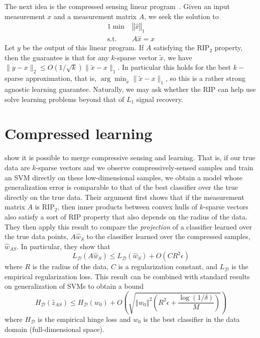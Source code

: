 \documentclass[english]{article}
\begin{document}
The next idea is the compressed sensing linear program~\citep{Candes06}.
Given an input measurement $x$ and a measurement matrix $A$, we seek the solution to
\begin{alignat*}{1}
\min & \left\Vert \widehat{x}\right\Vert _{1}\\
\text{s.t.} & A\widehat{x}=x
\end{alignat*}
Let $y$ be the output of this linear program.
If $A$ satisfying the RIP$_2$ property, then the guarantee is that for any $k$-sparse vector $\tilde{x}$, we have $\|y - x\|_2 \le O(1/\sqrt{k}) \|\tilde{x}-x\|_1$.
In particular this holds for the best $k-$sparse approximation, that is, $\arg\min_{\tilde{x}} \|\tilde{x}-x\|_1$, so this is a rather strong agnostic learning guarantee.
Naturally, we may ask whether the RIP can help use solve learning problems beyond that of $L_1$ signal recovery.

\section{Compressed learning}
\citet{Calderbank09} show it is possible to merge compressive sensing and learning. That is, if our true data are $k$-sparse vectors and we observe compressively-sensed samples and train an SVM directly on these low-dimensional samples, we obtain a model whose generalization error is comparable to that of the best classifier over the true directly on the true data. Their argument first shows that if the measurement matrix $A$ is RIP$_2$, then inner products between convex hulls of $k$-sparse vectors also satisfy a sort of RIP property that also depends on the radius of the data. They then apply this result to compare the \emph{projection} of a classifier learned over the true data points, $A\widehat{w}_S$ to the classifier learned over the compressed samples, $\widehat{w}_{AS}$. In particular, they show that 
\begin{equation}L_{\mathcal{D}}(A \widehat{w}_S) \leq L_{\mathcal{D}}(\widehat{w}_S) + O(CR^2\epsilon)
\label{eq:projection-loss-bound}
\end{equation}
where $R$ is the radius of the data, $C$ is a regularization constant, and $L_{\mathcal{D}}$ is the empirical regularization loss. This result can be combined with standard results on generalization of SVMs to obtain a bound 
\begin{equation}
H_{\mathcal{D}}(\widehat{z}_{AS}) \leq H_{\mathcal{D}}(w_0) + O\left( \sqrt{\left\Vert w_0 \right\Vert^2 \left( R^2 \epsilon + \frac{\log(1/\delta)}{M} \right)} \right)
\end{equation}
where $H_\mathcal{D}$ is the empirical hinge loss and $w_0$ is the best classifier in the data domain (full-dimensional space).
\end{document}
